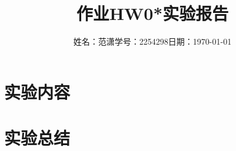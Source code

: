 \documentclass[a4paper]{article}
\title{作业{\hspace{1ex}}HW0*{\hspace{1ex}}实验报告}
\author{姓名：范潇{\quad}学号：2254298{\quad}日期：\today}
\date{}
\begin{document}
\maketitle


\newpage
\section{实验内容}

\newpage

\newpage

\newpage

\newpage

\newpage


\newpage
\section{实验总结}
\end{document}
